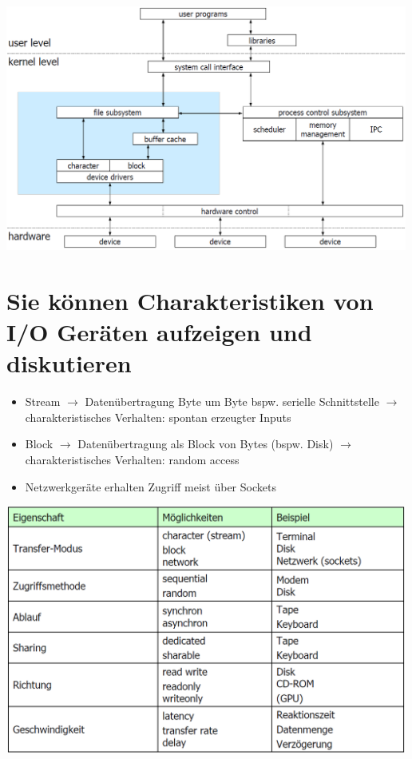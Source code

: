 \documentclass{report}
\newenvironment{Figure}
	{\par\medskip\noindent\minipage{\linewidth}}
	{\endminipage\par\medskip}
\theoremstyle{definition}
\theoremstyle{example}
\begin{document}
\begin{Figure}
\centering
\includegraphics[width=500px]{img/LinuxIOArchitektur.png}
	\label{fig:Abbildung der IO Linux Architektur}
\end{Figure}


\section{Sie können Charakteristiken von I/O Geräten aufzeigen  und diskutieren}

\begin{itemize}
	\item Stream $\rightarrow$ Datenübertragung Byte um Byte bspw. serielle Schnittstelle $\rightarrow$ charakteristisches Verhalten: spontan erzeugter Inputs
	\item Block $\rightarrow$ Datenübertragung als Block von Bytes (bspw. Disk) $\rightarrow$ charakteristisches Verhalten: random access
	\item Netzwerkgeräte erhalten Zugriff meist über Sockets
\end{itemize}


\begin{Figure}
\centering
\includegraphics[width=500px]{img/IOCharakteristik.png}
	\label{fig:Abbildung der IO Charakteristik}
\end{Figure}
\end{document}
